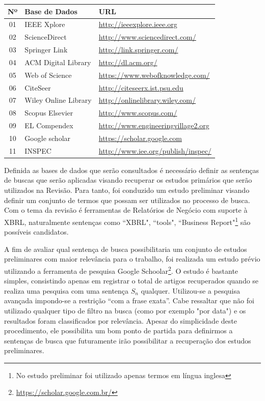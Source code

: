 \documentclass{article}
\begin{document}
\begin{center}
\begin{tabular}{cll}
\label{tab:base-dados}
 Nº&Base de Dados&URL\\
\hline
01 & IEEE Xplore  & \url{http://ieeexplore.ieee.org}\\
02 & ScienceDirect  & \url{http://www.sciencedirect.com/}\\
03 & Springer Link & \url{http://link.springer.com/}\\
04 & ACM Digital Library & \url{http://dl.acm.org/}\\
05 & Web of Science & \url{https://www.webofknowledge.com/}\\
06 & CiteSeer & \url{http://citeseerx.ist.psu.edu}\\
07 & Wiley Online Library & \url{http://onlinelibrary.wiley.com/}\\
08 & Scopus Elsevier & \url{http://www.scopus.com/}\\
09 & EL Compendex & \url{http://www.engineeringvillage2.org}\\
10 & Google scholar & \url{https://scholar.google.com}\\
11 &INSPEC  & \url{http://www.iee.org/publish/inspec/}\\
\end{tabular}
\end{center}


Definida as bases de dados que serão consultados é necessário definir as sentenças de buscas que serão aplicadas visando recuperar os estudos primários que serão utilizados na Revisão. Para tanto, foi conduzido um estudo preliminar visando definir um conjunto de termos que possam ser utilizados no processo de busca. Com o tema da revisão é ferramentas de Relatórios de Negócio com suporte à XBRL, naturalmente sentenças como ``XBRL", ``tools", ``Business Report"\footnote{No estudo preliminar foi utilizado apenas termos em língua inglesa} são possíveis candidatos.

A fim de avaliar qual sentença de busca possibilitaria um conjunto de estudos
preliminares com maior relevância para o trabalho, foi realizada um estudo
prévio utilizando a ferramenta de pesquisa Google
Schoolar\footnote{\url{https://scholar.google.com.br/}}. O estudo é bastante
simples, consistindo apenas em registrar o total de artigos recuperados quando
se realiza uma pesquisa com uma sentença $S_n$ qualquer. Utilizou-se a pesquisa
avançada impondo-se a restrição ``com a frase exata''. Cabe ressaltar que não foi utilizado qualquer tipo de filtro na busca (como por exemplo "por data") e os resultados foram classificados por relevância. Apesar do simplicidade deste procedimento, ele possibilita um bom ponto de partida para definirmos a sentenças de busca que futuramente irão possibilitar a recuperação dos estudos preliminares.
\end{document}
